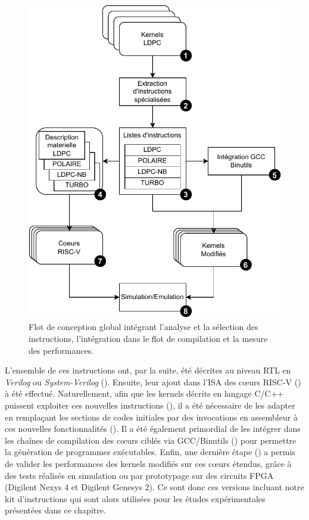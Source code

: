 \documentclass[../main.tex]{subfiles}
\begin{document}
\begin{figure}
\centering
\includegraphics[scale=1]{chapter3/figs/flot.pdf}
\caption{ Flot de conception global intégrant l'analyse et la sélection des instructions, l'intégration dans le flot de compilation et la mesure des performances.}
\label{flot}
\end{figure}

L'ensemble de ces instructions ont, par la suite, été décrites au niveau RTL en \textit{Verilog} ou \textit{System-Verilog} (). Ensuite, leur ajout dans l'ISA des cœurs RISC-V () \cite{ArchiRISC:V} à été effectué.
Naturellement, afin que les kernels décrits en langage C/C++ puissent exploiter ces nouvelles instructions (), il a été nécessaire de les adapter en remplaçant les sections de codes initiales par des invocations en assembleur à ces nouvelles fonctionnalités ().
Il a été également primordial de les intégrer dans les chaînes de compilation des cœurs ciblés via GCC/Binutils () pour permettre la génération de programmes exécutables.
Enfin, une dernière étape () a permis de valider les performances des kernels modifiés sur ces cœurs étendus, grâce à des tests réalisés en simulation ou par prototypage sur des circuits FPGA (Digilent Nexys 4 et Digilent Genesys 2).
Ce sont donc ces versions incluant notre kit d'instructions qui sont alors utilisées pour les études expérimentales présentées dans ce chapitre.
\end{document}
